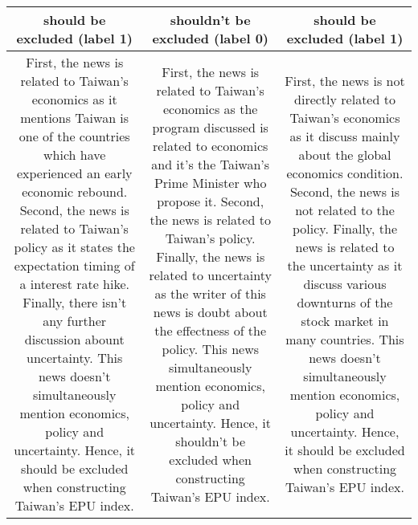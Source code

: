 {
\def\sym#1{\ifmmode^{#1}\else\(^{#1}\)\fi}
\begin{tabularx}{\textwidth}{c c c}
\hline

\textbf{should be excluded (label 1)} & 
\textbf{shouldn't be excluded (label 0)} & 
\textbf{should be excluded (label 1)}\\
\hline
First, the news is related to Taiwan's economics as it mentions Taiwan is one of the countries which have experienced an early economic rebound. Second, the news is related to Taiwan's policy as it states the expectation timing of a interest rate hike. Finally, there isn't any further discussion abount uncertainty. This news doesn't simultaneously mention economics, policy and uncertainty. Hence, it should be excluded when constructing Taiwan's EPU index.
&
First, the news is related to Taiwan's economics as the program discussed is related to economics and it's the Taiwan's Prime Minister who propose it. Second, the news is related to Taiwan's policy. Finally, the news is related to uncertainty as the writer of this news is doubt about the effectness of the policy. This news simultaneously mention economics, policy and uncertainty. Hence, it shouldn't be excluded when constructing Taiwan's EPU index.
&
First, the news is not directly related to Taiwan's economics as it discuss mainly about the global economics condition. Second, the news is not related to the policy. Finally, the news is related to the uncertainty as it discuss various downturns of the stock market in many countries. This news doesn't simultaneously mention economics, policy and uncertainty. Hence, it should be excluded when constructing Taiwan's EPU index.
\\
\hline


\end{tabularx}}
